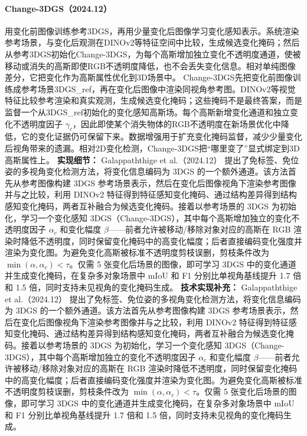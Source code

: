 \paragraph{Change-3DGS（2024.12）\cite{2412_03911}}
用变化前图像训练参考3DGS，再用少量变化后图像学习变化感知表示。系统渲染参考场景，与变化后观测在DINOv2等特征空间中比较，生成候选变化掩码；然后从参考3DGS初始化Change-3DGS，为每个高斯增加独立变化不透明度通道，使被移动或消失的高斯即使RGB不透明度降低，也不会丢失变化信息。相对单纯图像差分，它把变化作为高斯属性优化到3D场景中。
Change-3DGS先把变化前图像训练成参考场景3DGS\_ref，再在变化后图像中渲染同视角参考图。DINOv2等视觉特征比较参考渲染和真实观测，生成候选变化掩码；这些掩码不是最终答案，而是监督一个从3DGS\_ref初始化的变化感知高斯场。每个高斯新增变化通道和独立变化不透明度因子 $\gamma_c$，因此即使某个消失物体的RGB不透明度在新场景优化中降低，它的变化证据仍可保留下来。数据增强用于扩充变化掩码监督，减少少量变化后视角带来的遗漏。相对2D变化检测，Change-3DGS把“哪里变了”显式绑定到3D高斯属性上。
\textbf{实现细节：} Galappaththige et al.（2024.12） 提出了免标签、免位姿的多视角变化检测方法，将变化信息编码为 3DGS 的一个额外通道。该方法首先从参考图像构建 3DGS 参考场景表示，然后在变化后图像视角下渲染参考图像并与之比较，利用 DINOv2 特征得到特征感知变化掩码、通过结构差异得到结构感知变化掩码，两者互补融合为候选变化掩码。接着以参考场景的 3DGS 为初始化，学习一个变化感知 3DGS（Change-3DGS），其中每个高斯增加独立的变化不透明度因子 $\alpha_c$ 和变化幅度 $\beta$——前者允许被移动/移除对象对应的高斯在 RGB 渲染时降低不透明度，同时保留变化掩码中的高变化幅度；后者直接编码变化强度并渲染为变化图。为避免变化高斯被标准不透明度剪枝误删，剪枝条件改为 $\min(\alpha, \alpha_c) < \tau$。仅需 5 张变化后场景的图像，即可学习 3DGS 中的变化通道并生成变化掩码，在复杂多对象场景中 mIoU 和 F1 分别比单视角基线提升 1.7 倍和 1.5 倍，同时支持未见视角的变化掩码生成。
\textbf{技术实现补充：} Galappaththige et al.（2024.12） 提出了免标签、免位姿的多视角变化检测方法，将变化信息编码为 3DGS 的一个额外通道。该方法首先从参考图像构建 3DGS 参考场景表示，然后在变化后图像视角下渲染参考图像并与之比较，利用 DINOv2 特征得到特征感知变化掩码、通过结构差异得到结构感知变化掩码，两者互补融合为候选变化掩码。接着以参考场景的 3DGS 为初始化，学习一个变化感知 3DGS（Change-3DGS），其中每个高斯增加独立的变化不透明度因子 $\alpha_c$ 和变化幅度 $\beta$——前者允许被移动/移除对象对应的高斯在 RGB 渲染时降低不透明度，同时保留变化掩码中的高变化幅度；后者直接编码变化强度并渲染为变化图。为避免变化高斯被标准不透明度剪枝误删，剪枝条件改为 $\min(\alpha, \alpha_c) < \tau$。仅需 5 张变化后场景的图像，即可学习 3DGS 中的变化通道并生成变化掩码，在复杂多对象场景中 mIoU 和 F1 分别比单视角基线提升 1.7 倍和 1.5 倍，同时支持未见视角的变化掩码生成。
